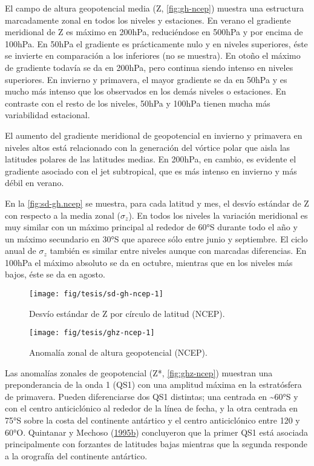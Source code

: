 \documentclass[spanish,a4paper,12p]{book}
\begin{document}
El campo de altura geopotencial media (Z, \autoref{fig:gh-ncep}) muestra
una estructura marcadamente zonal en todos los niveles y estaciones. En
verano el gradiente meridional de Z es máximo en 200hPa, reduciéndose en
500hPa y por encima de 100hPa. En 50hPa el gradiente es prácticamente
nulo y en niveles superiores, éste se invierte en comparación a los
inferiores (no se muestra). En otoño el máximo de gradiente todavía se
da en 200hPa, pero continua siendo intenso en niveles superiores. En
invierno y primavera, el mayor gradiente se da en 50hPa y es mucho más
intenso que los observados en los demás niveles o estaciones. En
contraste con el resto de los niveles, 50hPa y 100hPa tienen mucha más
variabilidad estacional.

El aumento del gradiente meridional de geopotencial en invierno y
primavera en niveles altos está relacionado con la generación del
vórtice polar que aisla las latitudes polares de las latitudes medias.
En 200hPa, en cambio, es evidente el gradiente asociado con el jet
subtropical, que es más intenso en invierno y más débil en verano.

En la \autoref{fig:sd-gh.ncep} se muestra, para cada latitud y mes, el
desvío estándar de Z con respecto a la media zonal (\(\sigma_z\)). En
todos los niveles la variación meridional es muy similar con un máximo
principal al rededor de 60°S durante todo el año y un máximo secundario
en 30°S que aparece sólo entre junio y septiembre. El ciclo anual de
\(\sigma_z\) también es similar entre niveles aunque con marcadas
diferencias. En 100hPa el máximo absoluto se da en octubre, mientras que
en los niveles más bajos, éste se da en agosto.

\begin{figure*}
\texttt{[image: fig/tesis/sd-gh-ncep-1]} \caption{Desvío estándar de Z por círculo de latitud (NCEP).}\label{fig:sd-gh-ncep}
\end{figure*}

\begin{landscape}\begin{figure}

{\centering \texttt{[image: fig/tesis/ghz-ncep-1]} 

}

\caption{Anomalía zonal de altura geopotencial (NCEP).}\label{fig:ghz-ncep}
\end{figure}
\end{landscape}

Las anomalías zonales de geopotencial (Z*, \autoref{fig:ghz-ncep})
muestran una preponderancia de la onda 1 (QS1) con una amplitud máxima
en la estratósfera de primavera. Pueden diferenciarse dos QS1 distintas;
una centrada en \textasciitilde{}60°S y con el centro anticiclónico al
rededor de la línea de fecha, y la otra centrada en 75°S sobre la costa
del continente antártico y el centro anticiclónico entre 120 y 60°O.
Quintanar y Mechoso
(\protect\hyperlink{ref-Quintanar1995}{1995}\protect\hyperlink{ref-Quintanar1995}{b})
concluyeron que la primer QS1 está asociada principalmente con forzantes
de latitudes bajas mientras que la segunda responde a la orografía del
continente antártico.
\end{document}
